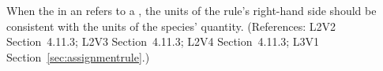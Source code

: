 When the  in an \AssignmentRule refers to a \Species, the
units of the rule's right-hand side should be consistent with the units of
the species' quantity.  (References: L2V2 Section~4.11.3;
L2V3 Section~4.11.3; L2V4 Section~4.11.3; L3V1 Section~\ref{sec:assignmentrule}.)
